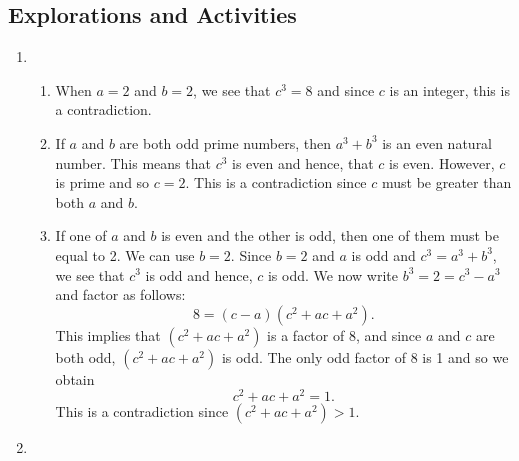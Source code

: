 \subsection*{Explorations and Activities}
\setcounter{oldenumi}{\theenumi}
\begin{enumerate} \setcounter{enumi}{\theoldenumi}
\item \begin{enumerate}
\item When $a = 2$ and $b = 2$, we see that $c^3 = 8$ and since $c$ is an integer, this is a contradiction.

\item If $a$ and $b$ are both odd prime numbers, then $a^3 + b^3$ is an even natural number.  This means that $c^3$ is even and hence, that $c$ is even.  However, $c$ is prime and so $c = 2$.  This is a contradiction since $c$ must be greater than both $a$ and $b$.

\item If one of $a$ and $b$ is even and the other is odd, then one of them must be equal to 2.  We can use $b = 2$.  Since $b = 2$ and $a$ is odd and $c^3 = a^3 + b^3$, we see that $c^3$ is odd and hence, $c$ is odd.  We now write $b^3 = 2 = c^3 - a^3$ and factor as follows:
\[
8 = (c - a) \left( c^2 + ac + a^2 \right).
\]
This implies that $\left( c^2 + ac + a^2 \right)$ is a factor of 8, and since $a$ and $c$ are both odd, 
$\left( c^2 + ac + a^2 \right)$ is odd.  The only odd factor of 8 is 1 and so we obtain
\[
c^2 + ac + a^2 = 1.
\]
This is a contradiction since $\left( c^2 + ac + a^2 \right) > 1$.
\end{enumerate}

\item {}
\end{enumerate}
